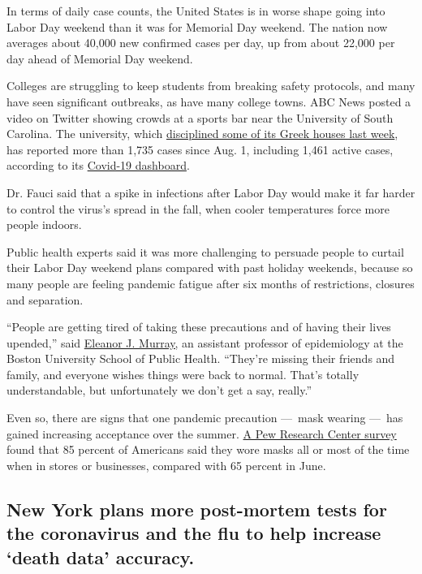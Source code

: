 In terms of daily case counts, the United States is in worse shape going
into Labor Day weekend than it was for Memorial Day weekend. The nation
now averages about 40,000 new confirmed cases per day, up from about
22,000 per day ahead of Memorial Day weekend.

Colleges are struggling to keep students from breaking safety protocols,
and many have seen significant outbreaks, as have many college towns.
ABC News posted a video on Twitter showing crowds at a sports bar near
the University of South Carolina. The university, which
\href{https://www.nytimes3xbfgragh.onion/2020/09/01/us/usc-covid-restrictions-parties.html}{disciplined
some of its Greek houses last week}, has reported more than 1,735 cases
since Aug. 1, including 1,461 active cases, according to its
\href{https://www.sc.edu/safety/coronavirus/dashboard/index.php}{Covid-19
dashboard}.

Dr. Fauci said that a spike in infections after Labor Day would make it
far harder to control the virus's spread in the fall, when cooler
temperatures force more people indoors.

Public health experts said it was more challenging to persuade people to
curtail their Labor Day weekend plans compared with past holiday
weekends, because so many people are feeling pandemic fatigue after six
months of restrictions, closures and separation.

``People are getting tired of taking these precautions and of having
their lives upended,'' said
\href{https://www.bu.edu/sph/profile/eleanor-murray/}{Eleanor J.
Murray,} an assistant professor of epidemiology at the Boston University
School of Public Health. ``They're missing their friends and family, and
everyone wishes things were back to normal. That's totally
understandable, but unfortunately we don't get a say, really.''

Even so, there are signs that one pandemic precaution ---~mask wearing
---~has gained increasing acceptance over the summer.
\href{https://www.pewresearch.org/fact-tank/2020/08/27/more-americans-say-they-are-regularly-wearing-masks-in-stores-and-other-businesses/}{A
Pew Research Center survey} found that 85 percent of Americans said they
wore masks all or most of the time when in stores or businesses,
compared with 65 percent in June.

\hypertarget{new-york-plans-more-post-mortem-tests-for-the-coronavirus-and-the-flu-to-help-increase-death-data-accuracy}{%
\subsection{New York plans more post-mortem tests for the coronavirus
and the flu to help increase `death data'
accuracy.}\label{new-york-plans-more-post-mortem-tests-for-the-coronavirus-and-the-flu-to-help-increase-death-data-accuracy}}

